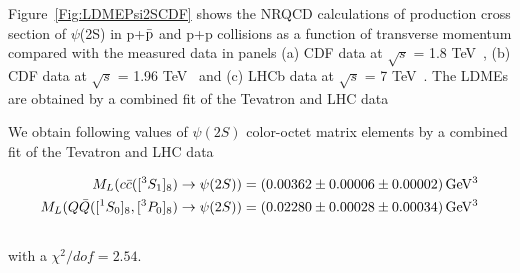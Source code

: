 \documentclass[12pt,a4paper,final]{iopart}
\newcommand{\barQ}{{\bar{Q}}}
\newcommand{\barc}{{\bar{c}}}
\newcommand{\charm}{{\rm{charm}}}
\begin{document}


 Figure~\ref{Fig:LDMEPsi2SCDF} shows the NRQCD calculations of production cross section 
of $\psi$(2S) in p+${\bar {\rm p}}$ and p+p collisions as a function of transverse 
momentum compared with the measured  data in panels
(a) CDF data at $\sqrt{s}$ = 1.8 TeV~\cite{Abe:1997jz}, 
(b) CDF data at $\sqrt{s}$ = 1.96 TeV~\cite{Acosta:2004yw} and 
(c) LHCb data at $\sqrt{s}$ = 7 TeV~\cite{Aaij:2012ag}.
 The LDMEs are obtained by a combined fit of the Tevatron and
LHC data






We obtain following values of $\psi(2S)$ color-octet matrix elements by a combined fit of 
the Tevatron and LHC data   

\begin{equation}
  \begin{split}
    M_{L}(c\barc([^3S_1]_{8})\rightarrow \psi(2S)) &= (0.00362\pm 0.00006 \pm {\color{black} 0.00002}) \, {\rm GeV^3}\\
    M_{L}(Q\barQ([^1S_0]_{8},[^3P_0]_{8})\rightarrow \psi(2S)) &= (0.02280\pm 0.00028 \pm {\color{black}0.00034}) \,{\rm GeV^3}\\
     ~\label{eq:COLDME_Psi}
  \end{split}
\end{equation}
with a {\color{black}$\chi^2/dof=2.54$}. 
\end{document}
